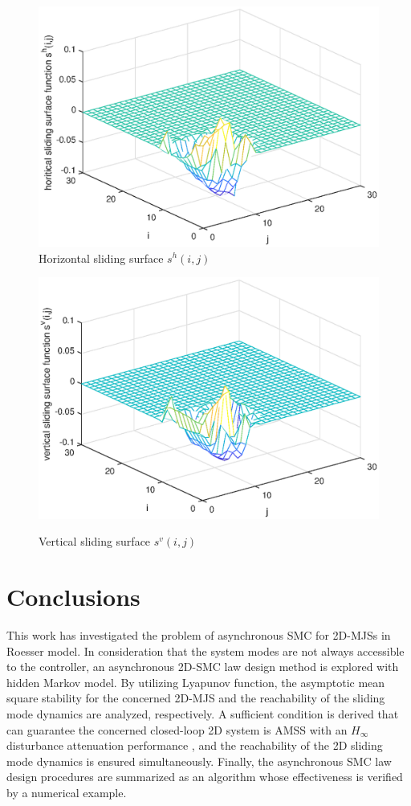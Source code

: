 \documentclass[journal,final,twocolumn]{IEEEtran}
\begin{document}
\begin{figure}[!htb]
	\centering\includegraphics[scale=0.6]{./simulations/hs_eps.eps}
	\caption{Horizontal  sliding surface $s^{h}(i,j)$}
	\label{fig9}
\end{figure}
\begin{figure}[!htb]
	\centering\includegraphics[scale=0.6]{./simulations/vs_eps.eps}\\ 
	\caption{Vertical sliding surface $s^{v}(i,j)$}
	\label{fig10}
\end{figure}


\section{Conclusions} \label{conclusion} 
This work has investigated the problem of asynchronous SMC for 2D-MJSs in Roesser model. In consideration that the system modes are not always accessible to the controller, an asynchronous 2D-SMC law design method is explored with hidden Markov model. By utilizing Lyapunov function, the asymptotic mean square stability for the concerned 2D-MJS  and the reachability of the sliding mode dynamics are analyzed, respectively. A sufficient condition is derived that can guarantee the concerned closed-loop 2D system is AMSS with an $H_{\infty}$ disturbance attenuation performance , and  the reachability of the 2D sliding mode dynamics is ensured simultaneously. Finally, the asynchronous SMC law design procedures are summarized as an algorithm whose effectiveness is verified by a numerical example.
\end{document}

